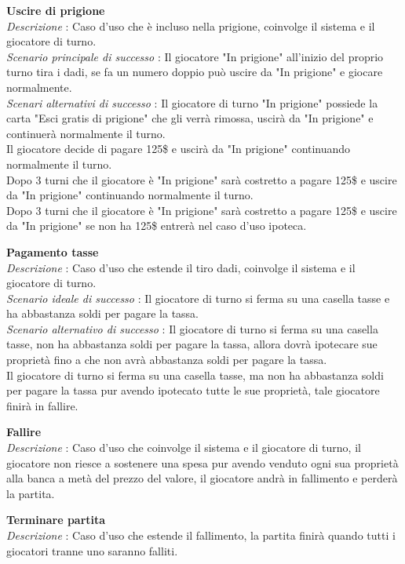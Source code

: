 \documentclass[a4paper]{article}
\begin{document}
\textbf{Uscire di prigione}\\
\textit{Descrizione} : Caso d'uso che è incluso nella prigione, coinvolge il sistema e il giocatore di turno.\\
\textit{Scenario principale di successo} : Il giocatore "In prigione" all'inizio del proprio turno tira i dadi, se fa un numero doppio può uscire da "In prigione" e giocare normalmente.\\
\textit{Scenari alternativi di successo} : Il giocatore di turno "In prigione" possiede la carta "Esci gratis di prigione" che gli verrà rimossa, uscirà da "In prigione" e continuerà normalmente il turno.\\
Il giocatore decide di pagare 125\$ e uscirà da "In prigione" continuando normalmente il turno.\\
Dopo 3 turni che il giocatore è "In prigione" sarà costretto a pagare 125\$ e uscire da "In prigione" continuando normalmente il turno.\\
Dopo 3 turni che il giocatore è "In prigione" sarà costretto a pagare 125\$ e uscire da "In prigione" se non ha 125\$ entrerà nel caso d'uso ipoteca.

\textbf{Pagamento tasse}\\
\textit{Descrizione} : Caso d'uso che estende il tiro dadi, coinvolge il sistema e il giocatore di turno.\\
\textit{Scenario ideale di successo} : Il giocatore di turno si ferma su una casella tasse e ha abbastanza soldi per pagare la tassa.\\
\textit{Scenario alternativo di successo} : Il giocatore di turno si ferma su una casella tasse, non ha abbastanza soldi per pagare la tassa, allora dovrà ipotecare sue proprietà fino a che non avrà abbastanza soldi per pagare la tassa.\\
Il giocatore di turno si ferma su una casella tasse, ma non ha abbastanza soldi per pagare la tassa pur avendo ipotecato tutte le sue proprietà, tale giocatore finirà in fallire.

\textbf{Fallire}\\
\textit{Descrizione} : Caso d'uso che coinvolge il sistema e il giocatore di turno, il giocatore non riesce a sostenere una spesa pur avendo venduto ogni sua proprietà alla banca a metà del prezzo del valore, il giocatore andrà in fallimento e perderà la partita.

\textbf{Terminare partita}\\
\textit{Descrizione} : Caso d'uso che estende il fallimento, la partita finirà quando tutti i giocatori tranne uno saranno falliti.
\end{document}

